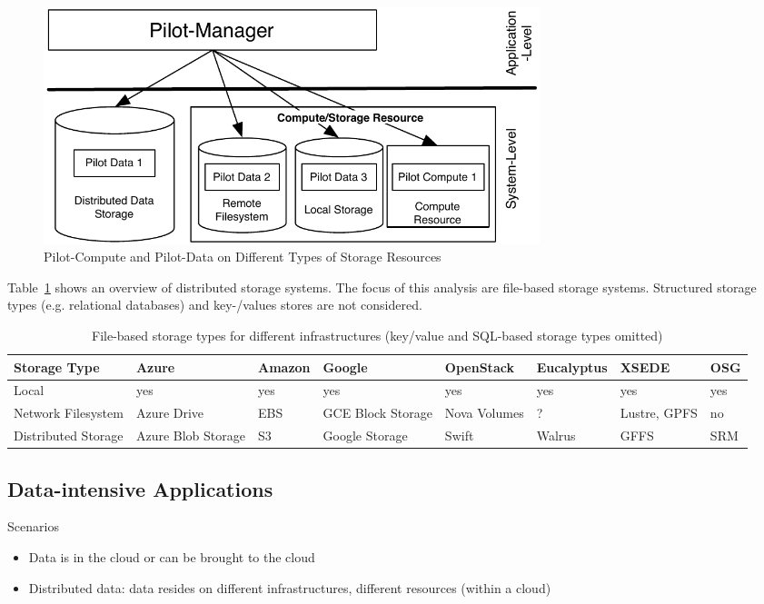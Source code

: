 \documentclass[times]{cpeauth}
\begin{document}
\begin{figure}[t]
	\centering
		\includegraphics[width=0.7\textwidth]{figures/storage-types.pdf}
	\caption{Pilot-Compute and Pilot-Data on Different Types of Storage Resources}
	\label{fig:figures_storage-types}
\end{figure}

Table~\ref{tab:storage-systems} shows an overview of distributed storage 
systems. The focus of this analysis are file-based storage systems. Structured
storage types (e.g. relational databases) and key-/values stores are not 
considered.

\begin{table}[t]
\centering
\begin{tabular}{|p{1.7cm}|p{1.3cm}|p{1.3cm}|p{1.3cm}|p{1.4cm}|p{1.4cm}|p{1.3cm}|p{1.2cm}|}
	\hline
	\textbf{Storage Type} &\textbf{Azure} &\textbf{Amazon} &\textbf{Google} &\textbf{Open\-Stack} &\textbf{Euca\-lyptus} &\textbf{XSEDE}  &\textbf{OSG} \\
	\hline
	Local	&yes &yes &yes &yes &yes &yes &yes\\
	\hline
	Network Filesystem &Azure Drive &EBS &GCE Block Storage &Nova Volumes &? &Lustre, GPFS 
	&no\\
	\hline
	Distributed Storage &Azure Blob Storage &S3 &Google Storage &Swift & Walrus &GFFS
	 &SRM\\
	\hline	
\end{tabular}
\caption{File-based storage types for different infrastructures (key/value and 
SQL-based storage types omitted) \label{tab:storage-systems}}
\end{table}


\subsection{Data-intensive Applications}

Scenarios
\begin{itemize}
	\item Data is in the cloud or can be brought to the cloud
	\item Distributed data: data resides on different infrastructures, different resources (within a cloud)
\end{itemize}
\end{document}
